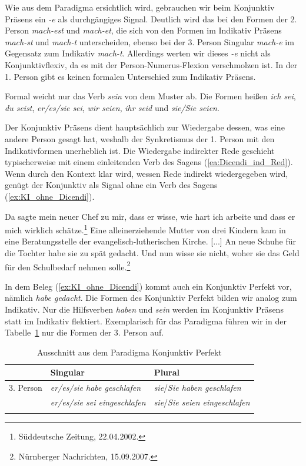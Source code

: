 Wie aus dem Paradigma ersichtlich wird, gebrauchen wir beim Konjunktiv Präsens ein \textit{-e} als durchgängiges Signal. Deutlich wird das bei den Formen der 2. Person \textit{mach-est} und \textit{mach-et}, die sich von den Formen im Indikativ Präsens \textit{mach-st} und \textit{mach-t} unterscheiden, ebenso bei der 3. Person Singular \textit{mach-e} im Gegensatz zum Indikativ \textit{mach-t}. Allerdings werten wir dieses \textit{-e} nicht als Konjunktivflexiv, da es mit der Person-Numerus-Flexion verschmolzen ist. In der 1. Person gibt es keinen formalen Unterschied zum Indikativ Präsens. 

Formal weicht nur das Verb \textit{sein} von dem Muster ab. Die Formen heißen \textit{ich sei}, \textit{du seist}, \textit{er/es/sie sei}, \textit{wir seien}, \textit{ihr seid} und \textit{sie/Sie seien}. 

Der Konjunktiv Präsens dient hauptsächlich zur Wiedergabe dessen, was eine andere Person gesagt hat, weshalb der Synkretismus der 1. Person mit den Indikativformen unerheblich ist. Die Wiedergabe indirekter Rede geschieht typischerweise mit einem einleitenden Verb des Sagens (\ref{ea:Dicendi_ind_Red}). Wenn durch den Kontext klar wird, wessen Rede indirekt wiedergegeben wird, genügt der Konjunktiv als Signal ohne ein Verb des Sagens (\ref{ex:KI_ohne_Dicendi}).

\ea \label{ea:KonI_indRede}
\ea \label{ea:Dicendi_ind_Red} Da sagte mein neuer Chef zu mir, dass er wisse, wie hart ich arbeite und dass er mich wirklich schätze.\footnote{Süddeutsche Zeitung, 22.04.2002.}
\ex \label{ex:KI_ohne_Dicendi} Eine alleinerziehende Mutter von drei Kindern kam in eine Beratungsstelle der evangelisch-lutherischen Kirche. [...] An neue Schuhe für die Tochter habe sie zu spät gedacht. Und nun wisse sie nicht, woher sie das Geld für den Schulbedarf nehmen solle.\footnote{Nürnberger Nachrichten, 15.09.2007.}
\z 
\z 

In dem Beleg (\ref{ex:KI_ohne_Dicendi}) kommt auch ein Konjunktiv Perfekt vor, nämlich \textit{habe gedacht}. Die Formen des Konjunktiv Perfekt bilden wir analog zum Indikativ. Nur die Hilfsverben \textit{haben} und \textit{sein} werden im Konjunktiv Präsens statt im Indikativ flektiert. Exemplarisch für das Paradigma führen wir in der Tabelle~\ref{tab:KonjPerf} nur die Formen der 3. Person auf.

\begin{table}
  \centering
  \begin{tabular}{l l l}
    \lsptoprule
    & Singular & Plural \\
    \hline
    3. Person & \textit{er/es/sie habe geschlafen} & \textit{sie}/\textit{Sie haben geschlafen} \\
    
    & \textit{er/es/sie sei eingeschlafen} & \textit{sie}/\textit{Sie seien eingeschlafen} \\
    \lspbottomrule 
  \end{tabular}
  \caption{Ausschnitt aus dem Paradigma Konjunktiv Perfekt}
  \label{tab:KonjPerf}
\end{table}

